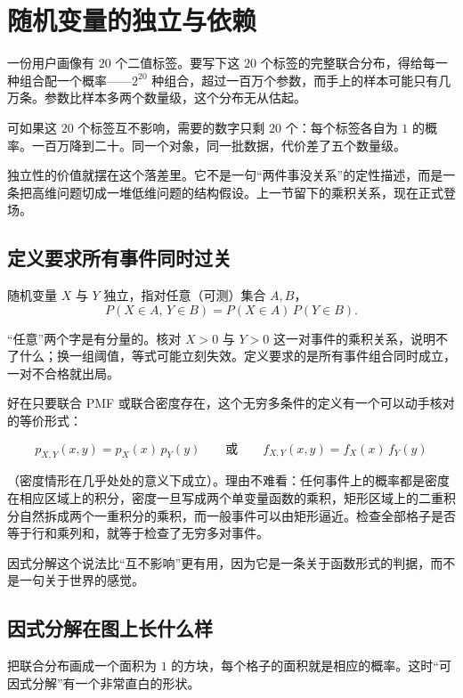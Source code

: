 \section{随机变量的独立与依赖}
\label{sec:05-Probability/05-Joint-Distributions/02}

一份用户画像有 \(20\) 个二值标签。要写下这 \(20\) 个标签的完整联合分布，得给每一种组合配一个概率——\(2^{20}\) 种组合，超过一百万个参数，而手上的样本可能只有几万条。参数比样本多两个数量级，这个分布无从估起。

可如果这 \(20\) 个标签互不影响，需要的数字只剩 \(20\) 个：每个标签各自为 \(1\) 的概率。一百万降到二十。同一个对象，同一批数据，代价差了五个数量级。

独立性的价值就摆在这个落差里。它不是一句``两件事没关系''的定性描述，而是一条把高维问题切成一堆低维问题的结构假设。上一节留下的乘积关系，现在正式登场。

\subsection{定义要求所有事件同时过关}

\begin{definition}
随机变量 \(X\) 与 \(Y\) 独立，指对任意（可测）集合 \(A,B\)，
\[
P(X\in A,\,Y\in B)=P(X\in A)\,P(Y\in B).
\]
\end{definition}

``任意''两个字是有分量的。核对 \(X>0\) 与 \(Y>0\) 这一对事件的乘积关系，说明不了什么；换一组阈值，等式可能立刻失效。定义要求的是所有事件组合同时成立，一对不合格就出局。

好在只要联合 PMF 或联合密度存在，这个无穷多条件的定义有一个可以动手核对的等价形式：

\[
p_{X,Y}(x,y)=p_X(x)\,p_Y(y)
\qquad\text{或}\qquad
f_{X,Y}(x,y)=f_X(x)\,f_Y(y)
\]

（密度情形在几乎处处的意义下成立）。理由不难看：任何事件上的概率都是密度在相应区域上的积分，密度一旦写成两个单变量函数的乘积，矩形区域上的二重积分自然拆成两个一重积分的乘积，而一般事件可以由矩形逼近。检查全部格子是否等于行和乘列和，就等于检查了无穷多对事件。

因式分解这个说法比``互不影响''更有用，因为它是一条关于函数形式的判据，而不是一句关于世界的感觉。

\subsection{因式分解在图上长什么样}

把联合分布画成一个面积为 \(1\) 的方块，每个格子的面积就是相应的概率。这时``可因式分解''有一个非常直白的形状。

